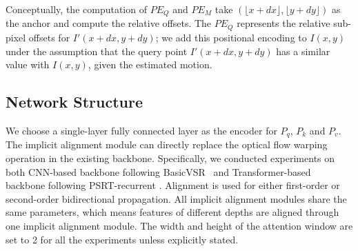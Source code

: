 \documentclass[10pt,twocolumn,letterpaper]{article}
\begin{document}
Conceptually, the computation of $PE_Q$ and $PE_M$ take $(\lfloor x+dx \rfloor, \lfloor y+dy \rfloor)$ as the anchor and compute the relative offsets. The $PE_Q$ represents the relative sub-pixel offsets for $I'(x+dx, y+dy)$; we add this positional encoding to $I(x,y)$ under the assumption that the query point $I'(x+dx, y+dy)$ has a similar value with $I(x,y)$, given the estimated motion.




\subsection{Network Structure}
We choose a single-layer fully connected layer as the encoder for $P_q$, $P_k$ and $P_v$. The implicit alignment module can directly replace the optical flow warping operation in the existing backbone. Specifically, we conducted experiments on both CNN-based backbone following BasicVSR~\cite{chan2021basicvsr} and Transformer-based backbone following PSRT-recurrent \cite{shi2022rethinking}. Alignment is used for either first-order or second-order bidirectional propagation. All implicit alignment modules share the same parameters, which means features of different depths are aligned through one implicit alignment module. The width and height of the attention window are set to 2 for all the experiments unless explicitly stated.
\end{document}

